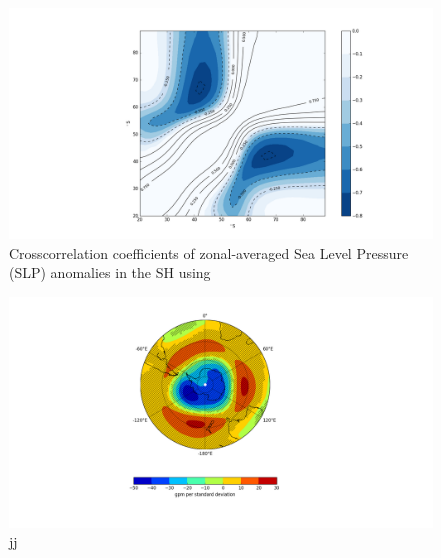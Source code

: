  
	
	
	\begin{figure}
		\centering
		\includegraphics[scale=0.4]{pictures/correlation_IERA.png}
		\caption{Crosscorrelation coefficients of zonal-averaged Sea Level Pressure (SLP) anomalies in the SH using} \label{fig:correlation_sam}
	\end{figure}
	
	\begin{figure}
		\includegraphics[scale=0.5]{pictures/regression_all.png}
		\caption{jj} 
	\end{figure}
	
%	
%	
	
